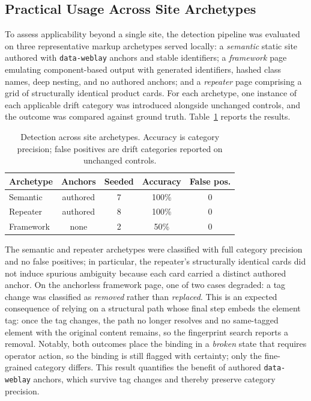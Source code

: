 \documentclass[conference]{IEEEtran}
\begin{document}
\subsection{Practical Usage Across Site Archetypes}
To assess applicability beyond a single site, the detection pipeline was evaluated on three representative markup archetypes served locally: a \emph{semantic} static site authored with \texttt{data-weblay} anchors and stable identifiers; a \emph{framework} page emulating component-based output with generated identifiers, hashed class names, deep nesting, and no authored anchors; and a \emph{repeater} page comprising a grid of structurally identical product cards. For each archetype, one instance of each applicable drift category was introduced alongside unchanged controls, and the outcome was compared against ground truth. Table~\ref{tab:archetype} reports the results.

\begin{table}[t]
\caption{Detection across site archetypes. Accuracy is category precision; false positives are drift categories reported on unchanged controls.}
\label{tab:archetype}
\centering
\footnotesize
\begin{tabular}{@{}lcccc@{}}
\toprule
\textbf{Archetype} & \textbf{Anchors} & \textbf{Seeded} & \textbf{Accuracy} & \textbf{False pos.} \\
\midrule
Semantic  & authored & 7 & 100\% & 0 \\
Repeater  & authored & 8 & 100\% & 0 \\
Framework & none     & 2 & 50\%  & 0 \\
\bottomrule
\end{tabular}
\end{table}

The semantic and repeater archetypes were classified with full category precision and no false positives; in particular, the repeater's structurally identical cards did not induce spurious ambiguity because each card carried a distinct authored anchor. On the anchorless framework page, one of two cases degraded: a tag change was classified as \emph{removed} rather than \emph{replaced}. This is an expected consequence of relying on a structural path whose final step embeds the element tag: once the tag changes, the path no longer resolves and no same-tagged element with the original content remains, so the fingerprint search reports a removal. Notably, both outcomes place the binding in a \emph{broken} state that requires operator action, so the binding is still flagged with certainty; only the fine-grained category differs. This result quantifies the benefit of authored \texttt{data-weblay} anchors, which survive tag changes and thereby preserve category precision.
\end{document}
